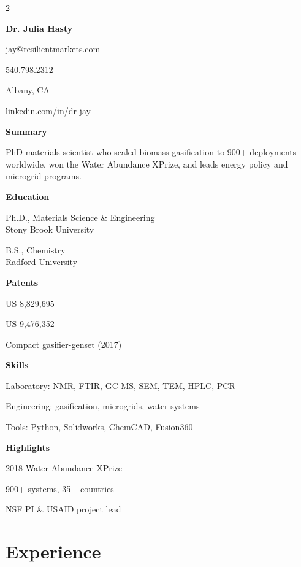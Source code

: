 \documentclass[10pt,letterpaper]{article}
\newcommand{\sidebarheading}[1]{{\bfseries\color{sidebarText}#1\par\vspace{4pt}}}
\newcommand{\sidebaritem}[1]{{\small\color{sidebarText}#1\par\vspace{3pt}}}
\begin{document}
\begin{paracol}{2}
\colorbox{sidebar}{%
  \begin{minipage}[t][\textheight][t]{0.30\textwidth}
    \vspace{8pt}
    \hspace{8pt}
    \begin{minipage}{0.88\linewidth}
      {\LARGE\bfseries\color{sidebarText} Dr. Julia Hasty}\\[8pt]
      \sidebaritem{\href{mailto:jay@resilientmarkets.com}{jay@resilientmarkets.com}}
      \sidebaritem{540.798.2312}
      \sidebaritem{Albany, CA}
      \sidebaritem{\href{https://www.linkedin.com/in/dr-jay/}{linkedin.com/in/dr-jay}}

      \vspace{10pt}
      \sidebarheading{Summary}
      \sidebaritem{PhD materials scientist who scaled biomass gasification to 900+ deployments worldwide, won the Water Abundance XPrize, and leads energy policy and microgrid programs.}

      \vspace{8pt}
      \sidebarheading{Education}
      \sidebaritem{Ph.D., Materials Science \& Engineering\\Stony Brook University}
      \sidebaritem{B.S., Chemistry\\Radford University}

      \vspace{8pt}
      \sidebarheading{Patents}
      \sidebaritem{US 8,829,695}
      \sidebaritem{US 9,476,352}
      \sidebaritem{Compact gasifier-genset (2017)}

      \vspace{8pt}
      \sidebarheading{Skills}
      \sidebaritem{Laboratory: NMR, FTIR, GC-MS, SEM, TEM, HPLC, PCR}
      \sidebaritem{Engineering: gasification, microgrids, water systems}
      \sidebaritem{Tools: Python, Solidworks, ChemCAD, Fusion360}

      \vspace{8pt}
      \sidebarheading{Highlights}
      \sidebaritem{2018 Water Abundance XPrize}
      \sidebaritem{900+ systems, 35+ countries}
      \sidebaritem{NSF PI \& USAID project lead}
    \end{minipage}
  \end{minipage}
}

\switchcolumn
\vspace{-4pt}

\section{Experience}


\end{paracol}
\end{document}

